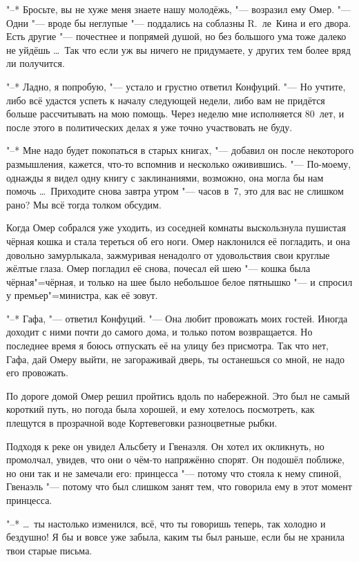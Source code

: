 "--* Бросьте, вы не хуже меня знаете нашу молодёжь, "--- возразил ему Омер.
"--- Одни "--- вроде бы неглупые "--- поддались на соблазны R.~ле~Кина и его
двора.
Есть другие "--- почестнее и попрямей душой, но без большого ума тоже далеко не
уйдёшь \ldots\
Так что если уж вы ничего не придумаете, у других тем более вряд ли получится.

"--* Ладно, я попробую, "--- устало и грустно ответил Конфуций.
"--- Но учтите, либо всё удастся успеть к началу следующей недели, либо вам не
придётся больше рассчитывать на мою помощь.
Через неделю мне исполняется 80~лет, и после этого в политических делах я уже
точно участвовать не буду.

"--* Мне надо будет покопаться в старых книгах, "--- добавил он после некоторого
размышления, кажется, что-то вспомнив и несколько оживившись.
"--- По-моему, однажды я видел одну книгу с заклинаниями, возможно, она могла бы
нам помочь \ldots\
Приходите снова завтра утром "--- часов в~7, это для вас не слишком рано?
Мы всё тогда толком обсудим.

Когда Омер собрался уже уходить, из соседней комнаты выскользнула пушистая
чёрная кошка и стала тереться об его ноги.
Омер наклонился её погладить, и она довольно замурлыкала, зажмуривая ненадолго
от удовольствия свои круглые жёлтые глаза.
Омер погладил её снова, почесал ей шею "--- кошка была чёрная"=чёрная, и только
на шее было небольшое белое пятнышко "--- и спросил у премьер"=министра, как её
зовут.

"--* Гафа, "--- ответил Конфуций.
"--- Она любит провожать моих гостей.
Иногда доходит с ними почти до самого дома, и только потом возвращается.
Но последнее время я боюсь отпускать её на улицу без присмотра.
Так что нет, Гафа, дай Омеру выйти, не загораживай дверь, ты останешься со мной,
не надо его провожать.

По дороге домой Омер решил пройтись вдоль по набережной.
Это был не самый короткий путь, но погода была хорошей, и ему хотелось
посмотреть, как плещутся в прозрачной воде Кортевеговки разноцветные рыбки.

Подходя к реке он увидел Альсбету и Гвенаэля.
Он хотел их окликнуть, но промолчал, увидев, что они о чём-то напряжённо спорят.
Он подошёл поближе, но они так и не замечали его: принцесса "--- потому что
стояла к нему спиной, Гвенаэль "--- потому что был слишком занят тем, что
говорила ему в этот момент принцесса.

"--* \ldots\ ты настолько изменился, всё, что ты говоришь теперь, так холодно
и бездушно!
Я бы и вовсе уже забыла, каким ты был раньше, если бы не хранила твои старые
письма.

